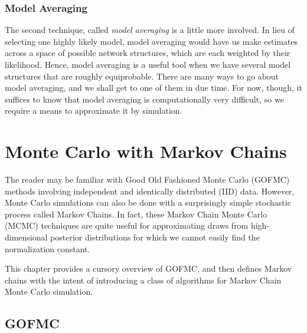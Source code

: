 \documentclass[12pt,twoside]{reedthesis}
\begin{document}
	\subsection*{Model Averaging}
	The second technique, called {\em model averaging} is a little more involved. In lieu of selecting one highly likely model, model averaging would have us make estimates across a space of possible network structures, which are each weighted by their likelihood. Hence, model averaging is a useful tool when we have several model structures that are roughly equiprobable. There are many ways to go about model averaging, and we shall get to one of them in due time. For now, though, it suffices to know that model averaging is computationally very difficult, so we require a means to approximate it by simulation.
	
\chapter{Monte Carlo with Markov Chains}
	The reader may be familiar with Good Old Fashioned Monte Carlo (GOFMC) methods involving independent and identically distributed (IID) data. However, Monte Carlo simulations can also be done with a surprisingly simple stochastic process called Markov Chains. In fact, these Markov Chain Monte Carlo (MCMC) techniques are quite useful for approximating draws from high-dimensional posterior distributions for which we cannot easily find the normalization constant. 
	
	This chapter provides a cursory overview of GOFMC, and then defines Markov chains with the intent of introducing a class of algorithms for Markov Chain Monte Carlo simulation.
	\section{GOFMC}
\end{document}
